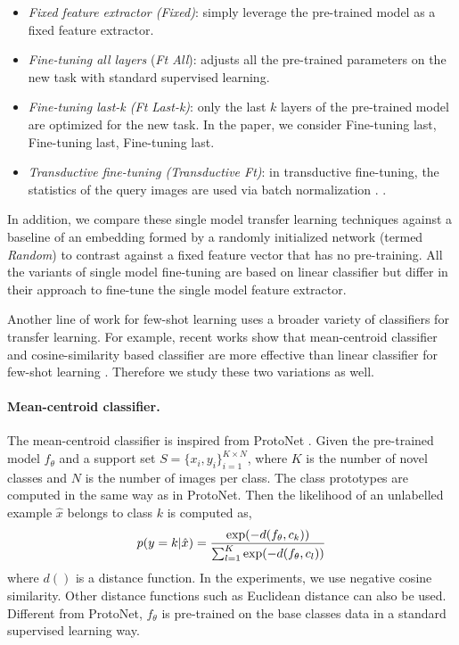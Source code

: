 \documentclass[runningheads]{llncs}
\begin{document}
\begin{itemize}
\item \textit{Fixed feature extractor (Fixed)}: simply leverage the pre-trained model as a fixed feature extractor. 
    
    \item \textit{Fine-tuning all layers} (\textit{Ft All}): adjusts all the pre-trained parameters on the new task with standard
    supervised learning. 
    
    \item \textit{Fine-tuning last\--k (Ft Last-k)}: only the last $k$ layers of the pre-trained model are optimized for the new task. In the paper, we consider Fine-tuning last,  Fine-tuning last, Fine-tuning last.
    
    \item \textit{Transductive fine-tuning (Transductive Ft)}: in transductive fine-tuning, the statistics of the query images are used via batch normalization \cite{dhillonfsbaseline}.  \cite{nichol2018first}.
\end{itemize}

In addition, we compare these single model transfer learning techniques against a baseline of an embedding formed by a randomly initialized network (termed {\em Random}) to contrast against a fixed feature vector that has no pre-training. All the variants of single model fine-tuning are based on linear classifier but differ in their approach to fine-tune the single model feature extractor.

Another line of work for few-shot learning uses a broader variety of classifiers for transfer learning. For example, recent works show that mean-centroid classifier and cosine-similarity based classifier are more effective than linear classifier for few-shot learning \cite{mensink2013distance,chen2018a}. Therefore we study these two variations as well.

\paragraph{Mean-centroid classifier.}
The mean-centroid classifier is inspired from ProtoNet \cite{snell2017prototypical}. Given the pre-trained model $f_{\theta}$ and a support set $S = \{x_i, y_i\}_{i=1}^{K \times N}$, where $K$ is the number of novel classes and $N$ is the number of images per class. The class prototypes are computed in the same way as in ProtoNet. Then the likelihood of an unlabelled example $\hat{x}$ belongs to class $k$ is computed as,
\begin{equation}
    p(y=k | \hat{x}) = \frac{\textnormal{exp}(-d(f_{\theta}, c_k ))}{\sum_{l=1}^K \textnormal{exp}(-d(f_{\theta}, c_l))}
\end{equation}
where $d()$ is a distance function. In the experiments, we use negative cosine similarity. Other distance functions such as Euclidean distance can also be used. Different from ProtoNet, $f_\theta$ is pre-trained on the base classes data in a standard supervised learning way.
\end{document}
